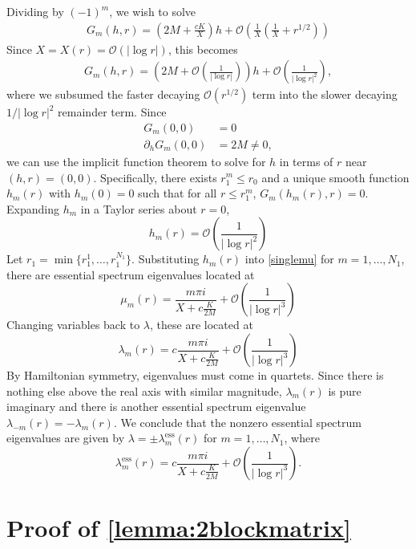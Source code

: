 \documentclass[thesis.tex]{subfiles}
\begin{document}
Dividing by $(-1)^m$, we wish to solve 
\begin{align*}
G_m(h, r) = \left( 2M + \frac{cK}{X} \right)h + \mathcal{O}\left( \frac{1}{X} \left( \frac{1}{X} + r^{1/2} \right) \right)
\end{align*}
Since $X = X(r) = \mathcal{O}(|\log r|)$, this becomes
\begin{align*}
G_m(h, r) = \left( 2M + \mathcal{O}\left( \frac{1}{|\log r|} \right)\right) h + \mathcal{O}\left( \frac{1}{|\log r|^2} \right),
\end{align*}
where we subsumed the faster decaying $\mathcal{O}(r^{1/2})$ term into the slower decaying $1/|\log r|^2$ remainder term. Since
\begin{align*}
G_m(0,0) &= 0 \\
\partial_h G_m(0,0) &= 2M \neq 0,
\end{align*}
we can use the implicit function theorem to solve for $h$ in terms of $r$ near $(h,r) = (0,0)$. Specifically, there exists $r_1^m \leq r_0$ and a unique smooth function $h_m(r)$ with $h_m(0) = 0$ such that for all $r \leq r_1^m$, $G_m(h_m(r),r) = 0$. Expanding $h_m$ in a Taylor series about $r = 0$,
\[
h_m(r) = \mathcal{O}\left( \frac{1}{|\log r|^2} \right)
\]
Let $r_1 = \min\{ r_1^1, \dots, r_1^{N_1} \}$. Substituting $h_m(r)$ into \cref{singlemu} for $m = 1, \dots, N_1$, there are essential spectrum eigenvalues located at
\[
\mu_m(r) = \frac{m \pi i}{X + c \frac{K}{2 M}} + \mathcal{O}\left( \frac{1}{|\log r|^3} \right)
\]
Changing variables back to $\lambda$, these are located at
\[
\lambda_m(r) = c  \frac{m \pi i}{X + c \frac{K}{2 M}} + \mathcal{O}\left( \frac{1}{|\log r|^3} \right)
\]
By Hamiltonian symmetry, eigenvalues must come in quartets. Since there is nothing else above the real axis with similar magnitude, $\lambda_m(r)$ is pure imaginary and there is another essential spectrum eigenvalue $\lambda_{-m}(r) = -\lambda_m(r)$. We conclude that the nonzero essential spectrum eigenvalues are given by $\lambda = \pm \lambda_m^{\text{ess}}(r)$ for $m = 1, \dots, N_1$, where
\[
\lambda_m^{\text{ess}}(r) = c  \frac{m \pi i}{X + c \frac{K}{2 M}} + \mathcal{O}\left( \frac{1}{|\log r|^3} \right).
\]

\section{Proof of \cref{lemma:2blockmatrix} }
\end{document}
